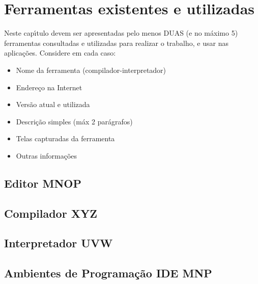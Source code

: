 

\chapter{Ferramentas existentes e utilizadas}

Neste cap\'{\i}tulo devem ser apresentadas pelo menos DUAS (e no m\'{a}ximo 5) ferramentas consultadas e utilizadas para realizar o trabalho, e usar nas aplica\c{c}\~{o}es. Considere em cada caso:
\begin{itemize}
  \item Nome da ferramenta (compilador-interpretador)
  \item Endere\c{c}o na Internet
  \item Vers\~{a}o atual e utilizada
  \item Descri\c{c}\~{a}o simples (m\'{a}x 2 par\'{a}grafos)
  \item Telas capturadas da ferramenta
  \item Outras informa\c{c}\~{o}es
\end{itemize}

    \section{Editor MNOP}


    \section{Compilador XYZ}


    \section{Interpretador UVW}


    \section{Ambientes de Programa\c{c}\~{a}o IDE MNP} 